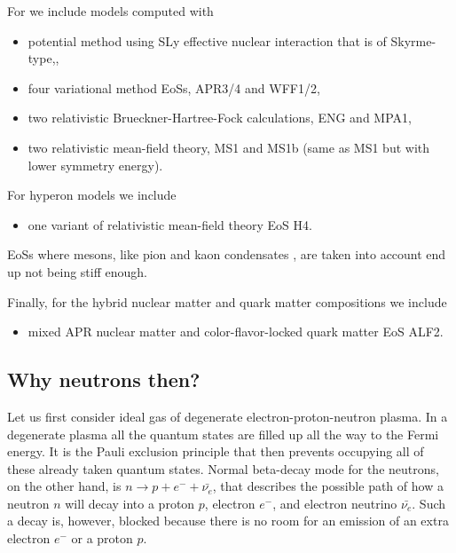 For \npem we include models computed with
\begin{itemize}
    \item potential method using SLy effective nuclear interaction that is of Skyrme-type,\cite{SLy},
    \item four variational method EoSs, APR3/4\cite{APR} and WFF1/2\cite{WFF},
    \item two relativistic Brueckner-Hartree-Fock calculations, ENG\cite{ENG} and MPA1\cite{MPA},
    \item two relativistic mean-field theory, MS1 and MS1b (same as MS1 but with lower symmetry energy)\cite{MS}.
\end{itemize}

For hyperon models \hyperon we include
\begin{itemize}
    \item one variant of relativistic mean-field theory EoS H4\cite{H4}.
\end{itemize}

EoSs where mesons, like pion and kaon condensates \pikaon, are taken into account end up not being stiff enough.

Finally, for the hybrid nuclear matter and quark matter compositions \quark we include 
\begin{itemize}
    \item mixed APR nuclear matter and color-flavor-locked quark matter EoS ALF2.\cite{ALF}
\end{itemize}



\subsection{Why neutrons then?}
Let us first consider ideal gas of degenerate electron-proton-neutron plasma.
In a degenerate plasma all the quantum states are filled up all the way to the Fermi energy.
It is the Pauli exclusion principle that then prevents occupying all of these already taken quantum states.
Normal beta-decay mode for the neutrons, on the other hand, is $n \rightarrow p + e^{-} + \bar{\nu_{e}}$, that describes the possible path of how a neutron $n$ will decay into a proton $p$, electron $e^{-}$, and electron neutrino $\bar{\nu_{e}}$.
Such a decay is, however, blocked because there is no room for an emission of an extra electron $e^{-}$ or a proton $p$.\cite[see e.g.][]{Phillips94}

